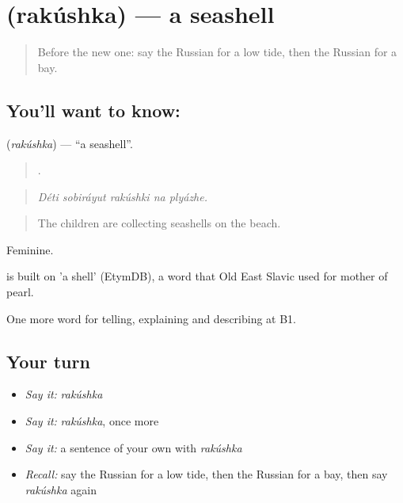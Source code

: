 \section[\texorpdfstring{\ru{ракушка} (rakúshka)}{ракушка (rakúshka)}]{ (rakúshka) — a seashell}

\label{lesson:RU-C463-rakushka}



\begin{quote}
Before the new one: say the Russian for a low tide, then the Russian for a bay.
\end{quote}

\subsection*{You'll want to know: }
\textbf{} (\emph{rakúshka}) — \textquotedblleft{}a seashell\textquotedblright{}.

\begin{quote}
    .
\end{quote}

\begin{quote}
\emph{Déti sobiráyut rakúshki na plyázhe.}
\end{quote}

\begin{quote}
The children are collecting seashells on the beach.
\end{quote}

Feminine.

\begin{cousinweb}
\emph{} is built on \emph{} 'a shell' (EtymDB), a word that Old East Slavic used for mother of pearl.
\end{cousinweb}

\begin{grammarlens}[title={What you've built}]
One more word for telling, explaining and describing at B1.
\end{grammarlens}

\subsection*{Your turn}
\begin{itemize}
\raggedright
  \item \emph{Say it:} \emph{rakúshka}
  \item \emph{Say it:} \emph{rakúshka}, once more
  \item \emph{Say it:} a sentence of your own with \emph{rakúshka}
  \item \emph{Recall:} say the Russian for a low tide, then the Russian for a bay, then say \emph{rakúshka} again
\end{itemize}

